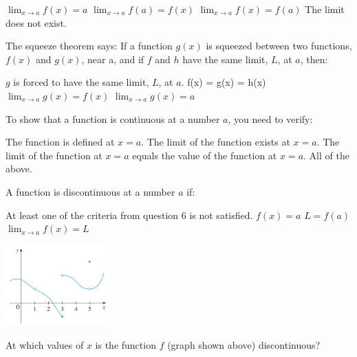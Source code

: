 \documentclass[addpoints, 12pt]{exam}%
\newcommand{\spc}{\vspace*{0.5cm}}
\begin{document}
\begin{questions}
\begin{choices}
\choice $\lim_{x \to a} f(x) = a$
\choice $\lim_{x \to a} f(a) = f(x)$
\CorrectChoice $\lim_{x \to a} f(x) = f(a)$
\choice The limit does not exist.
\end{choices}

\newpage

\question[1]

The squeeze theorem says: If a function $g(x)$ is squeezed between two functions, $f(x)$ and $g(x)$, near a, and if $f$ and $h$ have the same limit, $L$, at $a$, then:

\begin{choices}
\CorrectChoice $g$ is forced to have the same limit, $L$, at $a$.
\choice f(x) = g(x) = h(x)
\choice $\lim_{x \to a} g(x) = f(x)$
\choice $\lim_{x \to a} g(x) = a$
\end{choices}

\spc

\question[1]

To show that a function is continuous at a number $a$, you need to verify:

\begin{choices}
\choice The function is defined at $x = a$.
\choice The limit of the function exists at $x = a$.
\choice The limit of the function at $x = a$ equals the value of the function at $x = a$.
\CorrectChoice All of the above.
\end{choices}

\spc

\question[1]

A function is discontinuous at a number $a$ if:

\begin{choices}
\CorrectChoice At least one of the criteria from question 6 is not satisfied.
\choice $f(x) = a$
\choice $L = f(a)$
\choice $\lim_{x \to a} f(x) = L$
\end{choices}

\spc

\question[1]
\includegraphics[width=0.3\textwidth]{Discontinuous at x.png}

At which values of $x$ is the function $f$ (graph shown above) discontinuous?


\end{questions}
\end{document}
